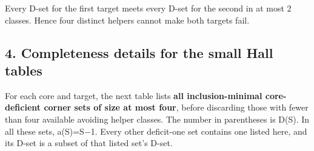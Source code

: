 \documentclass[
  10pt,
]{article}
\begin{document}
Every D-set for the first target meets every D-set for the second in at
most 2 classes. Hence four distinct helpers cannot make both targets
fail.

\hypertarget{completeness-details-for-the-small-hall-tables}{%
\subsection*{4. Completeness details for the small Hall
tables}\label{completeness-details-for-the-small-hall-tables}}

For each core and target, the next table lists \textbf{all
inclusion-minimal core-deficient corner sets of size at most four},
before discarding those with fewer than four available avoiding helper
classes. The number in parentheses is \textbar D(S)\textbar. In all
these sets, a(S)=\textbar S\textbar−1. Every other deficit-one set
contains one listed here, and its D-set is a subset of that listed set's
D-set.
\end{document}
